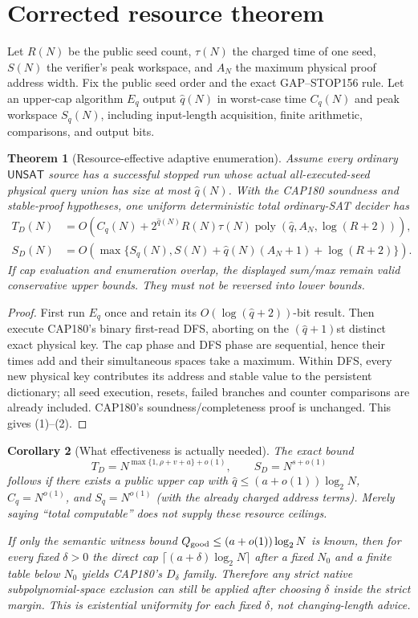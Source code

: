 \documentclass[11pt]{article}
\newtheorem{theorem}{Theorem}
\newtheorem{corollary}[theorem]{Corollary}
\newcommand{\UNSAT}{\mathsf{UNSAT}}
\begin{document}
\section{Corrected resource theorem}
Let $R(N)$ be the public seed count, $\tau(N)$ the charged time of one seed,
$S(N)$ the verifier's peak workspace, and $A_N$ the maximum physical proof
address width.  Fix the public seed order and the exact GAP--STOP156 rule.
Let an upper-cap algorithm $E_q$ output $\widehat q(N)$ in worst-case time
$C_q(N)$ and peak workspace $S_q(N)$, including input-length acquisition,
finite arithmetic, comparisons, and output bits.

\begin{theorem}[Resource-effective adaptive enumeration]\label{th:ledger}
Assume every ordinary $\UNSAT$ source has a successful stopped run whose
actual all-executed-seed physical query union has size at most
$\widehat q(N)$.  With the CAP180 soundness and stable-proof hypotheses, one
uniform deterministic total ordinary-SAT decider has
\begin{align}
T_D(N)&=O\!\left(C_q(N)+2^{\widehat q(N)}R(N)\tau(N)
 \operatorname{poly}(\widehat q,A_N,\log(R+2))\right),\tag{1}\\
S_D(N)&=O\!\left(\max\{S_q(N),
 S(N)+\widehat q(N)(A_N+1)+\log(R+2)\}\right).\tag{2}
\end{align}
If cap evaluation and enumeration overlap, the displayed sum/max remain
valid conservative upper bounds.  They must not be reversed into lower
bounds.
\end{theorem}
\begin{proof}
First run $E_q$ once and retain its $O(\log(\widehat q+2))$-bit result.
Then execute CAP180's binary first-read DFS, aborting on the
$(\widehat q+1)$st distinct exact physical key.  The cap phase and DFS phase
are sequential, hence their times add and their simultaneous spaces take a
maximum.  Within DFS, every new physical key contributes its address and
stable value to the persistent dictionary; all seed execution, resets,
failed branches and counter comparisons are already included.  CAP180's
soundness/completeness proof is unchanged.  This gives (1)--(2).
\end{proof}

\begin{corollary}[What effectiveness is actually needed]
The exact bound
\[
T_D=N^{\max\{1,\rho+v+a\}+o(1)},\qquad S_D=N^{s+o(1)}
\]
follows if there exists a public \emph{upper} cap with
$\widehat q\le(a+o(1))\log_2N$, $C_q=N^{o(1)}$, and
$S_q=N^{o(1)}$ (with the already charged address terms).  Merely saying
``total computable'' does not supply these resource ceilings.

If only the semantic witness bound $Q_{\rm good}\le(a+o(1))\log_2N$ is
known, then for every fixed $\delta>0$ the direct cap
$\lceil(a+\delta)\log_2N\rceil$ after a fixed $N_0$ and a finite table below
$N_0$ yields CAP180's $D_\delta$ family.  Therefore any strict native
subpolynomial-space exclusion can still be applied after choosing $\delta$
inside the strict margin.  This is existential uniformity for each fixed
$\delta$, not changing-length advice.
\end{corollary}
\end{document}
